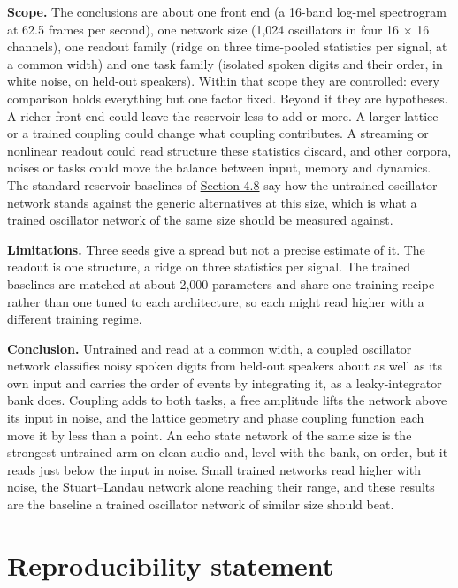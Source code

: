 \documentclass{article}
\makeatletter
\newcommand{\iclr@floatbarrier}{\par\vspace{\z@}%
  \ifx\@deferlist\@empty\else\clearpage\fi}
\let\iclr@section\section
\renewcommand{\section}{\iclr@floatbarrier\iclr@section}
\makeatother
\begin{document}
\textbf{Scope.} The conclusions are about one front end (a 16-band
log-mel spectrogram at 62.5 frames per second), one network size (1,024
oscillators in four 16 \ensuremath{\times} 16 channels), one readout
family (ridge on three time-pooled statistics per signal, at a common
width) and one task family (isolated spoken digits and their order, in
white noise, on held-out speakers). Within that scope they are
controlled: every comparison holds everything but one factor fixed.
Beyond it they are hypotheses. A richer front end could leave the
reservoir less to add or more. A larger lattice or a trained coupling
could change what coupling contributes. A streaming or nonlinear readout
could read structure these statistics discard, and other corpora, noises
or tasks could move the balance between input, memory and dynamics. The
standard reservoir baselines of \hyperref[sec-4-8]{Section 4.8} say how
the untrained oscillator network stands against the generic alternatives
at this size, which is what a trained oscillator network of the same
size should be measured against.

\textbf{Limitations.} Three seeds give a spread but not a precise
estimate of it. The readout is one structure, a ridge on three
statistics per signal. The trained baselines are matched at about 2,000
parameters and share one training recipe rather than one tuned to each
architecture, so each might read higher with a different training
regime.

\textbf{Conclusion.} Untrained and read at a common width, a coupled
oscillator network classifies noisy spoken digits from held-out speakers
about as well as its own input and carries the order of events by
integrating it, as a leaky-integrator bank does. Coupling adds to both
tasks, a free amplitude lifts the network above its input in noise, and
the lattice geometry and phase coupling function each move it by less
than a point. An echo state network of the same size is the strongest
untrained arm on clean audio and, level with the bank, on order, but it
reads just below the input in noise. Small trained networks read higher
with noise, the Stuart--Landau network alone reaching their range, and
these results are the baseline a trained oscillator network of similar
size should beat.

\section*{Reproducibility statement}\label{reproducibility-statement}
\end{document}
